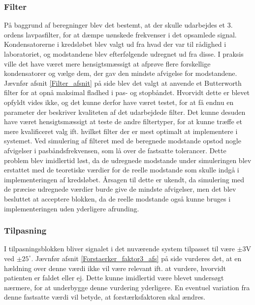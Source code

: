 \subsubsection{Filter}
På baggrund af beregninger blev det bestemt, at der skulle udarbejdes et 3. ordens lavpasfilter, for at dæmpe uønskede frekvenser i det opsamlede signal. Kondensatorerne i kredsløbet blev valgt ud fra hvad der var til rådighed i laboratoriet, og modstandene blev efterfølgende udregnet ud fra disse. I praksis ville det have været mere hensigtsmæssigt at afprøve flere forskellige kondensatorer og vælge dem, der gav den mindste afvigelse for modstandene.
Jævnfør afsnit \ref{Filter_afsnit} på side \pageref{Filter_afsnit} blev det valgt at anvende et Butterworth filter for at opnå maksimal fladhed i pas- og stopbåndet. Hvorvidt dette er blevet opfyldt vides ikke, og det kunne derfor have været testet, for at få endnu en parameter der beskriver kvaliteten af det udarbejdede filter. Det kunne desuden have været hensigtsmæssigt at teste de andre filtertyper, for at kunne træffe et mere kvalificeret valg ift. hvilket filter der er mest optimalt at implementere i systemet.   
Ved simulering af filteret med de beregnede modstande opstod nogle afvigelser i pasbåndsfrekvensen, som lå over de fastsatte tolerancer. Dette problem blev imidlertid løst, da de udregnede modstande under simuleringen blev erstattet med de teoretiske værdier for de reelle modstande som skulle indgå i implementeringen af kredsløbet. Årsagen til dette er ukendt, da simulering med de præcise udregnede værdier burde give de mindste afvigelser, men det blev besluttet at acceptere blokken, da de reelle modstande også kunne bruges i implementeringen uden yderligere afrunding.

\subsubsection{Tilpasning}
I tilpasningsblokken bliver signalet i det nuværende system tilpasset til være $\pm3$V ved $\pm25^{\circ}$. Jævnfør afsnit \ref{Forstaerker_faktor3_afs} på side \pageref{Forstaerker_faktor3_afs} vurderes det, at en hældning over denne værdi ikke vil være relevant ift. at vurdere, hvorvidt patienten er faldet eller ej. Dette kunne imidlertid være blevet undersøgt nærmere, for at underbygge denne vurdering yderligere. En eventuel variation fra denne fastsatte værdi vil betyde, at forstærksfaktoren skal ændres.  

